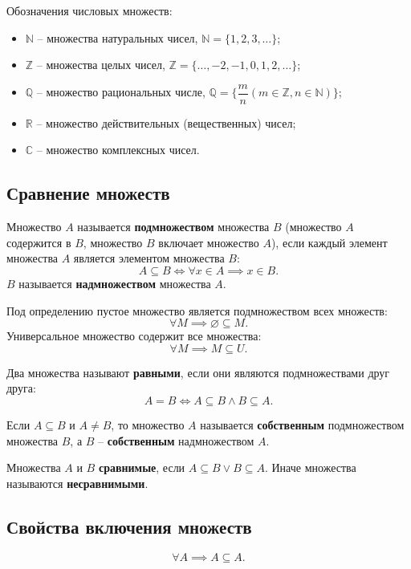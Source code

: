 Обозначения числовых множеств:
\begin{itemize}
    \item \(\mathbb{N}\) -- множества натуральных чисел, \(\mathbb{N} = \{1, 2, 3, \ldots\}\);
    \item \(\mathbb{Z}\) -- множества целых чисел, \(\mathbb{Z} = \{\ldots, -2, -1, 0, 1, 2, \ldots\}\);
    \item \(\mathbb{Q}\) -- множество рациональных числе, \(\mathbb{Q} = \Big\{\dfrac{m}{n} (m \in \mathbb{Z}, n \in \mathbb{N})\Big\}\);
    \item \(\mathbb{R}\) -- множество действительных (вещественных) чисел;
    \item \(\mathbb{C}\) -- множество комплексных чисел.
\end{itemize}

\subsection{Сравнение множеств}

Множество \(A\) называется \textbf{подмножеством} множества \(B\) (множество \(A\) содержится в \(B\), множество \(B\) включает множество \(A\)), если каждый элемент множества \(A\) является элементом множества \(B\):
\[
    A \subseteq B
    \iff
    \forall x \in A \implies x \in B.
\]
\(B\) называется \textbf{надмножеством} множества \(A\).

Под определению пустое множество является подмножеством всех множеств:
\[
    \forall M \implies \varnothing \subseteq M.
\]
Универсальное множество содержит все множества:
\[
    \forall M \implies M \subseteq U.
\]

Два множества называют \textbf{равными}, если они являются подмножествами друг друга:
\[
    A = B
    \iff
    A \subseteq B \land B \subseteq A.
\]

Если \(A \subseteq B\) и \(A \neq B\), то множество \(A\) называется \textbf{собственным} подмножеством множества \(B\), а \(B\) -- \textbf{собственным} надмножеством \(A\).

Множества \(A\) и \(B\) \textbf{сравнимые}, если \(A \subseteq B \lor B \subseteq A\). Иначе множества называются \textbf{несравнимыми}.

\subsection{Свойства включения множеств}

\begin{property}
    \[
        \forall A \implies A \subseteq A.
    \]
\end{property}

